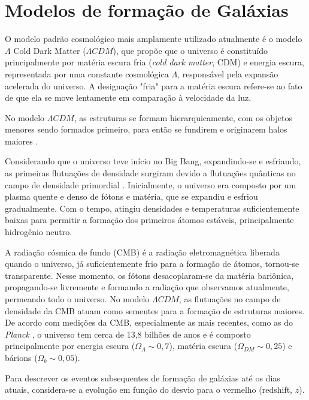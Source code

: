 \section{Modelos de formação de Galáxias}\label{subsec:modelo_formacao_galaxias}
O modelo padrão cosmológico mais amplamente utilizado atualmente é o modelo $\Lambda$ Cold Dark Matter ($\Lambda CDM$), que propõe que o universo é constituído principalmente por matéria escura fria ({\it cold dark matter}, CDM) e energia escura, representada por uma constante cosmológica $\Lambda$, responsável pela expansão acelerada do universo. A designação "fria" para a matéria escura refere-se ao fato de que ela se move lentamente em comparação à velocidade da luz. 

No modelo $\Lambda CDM$, as estruturas se formam hierarquicamente, com os objetos menores sendo formados primeiro, para então se fundirem e originarem halos maiores \citep{Blumenthal_1984}.

Considerando que o universo teve início no Big Bang, expandindo-se e esfriando, as primeiras flutuações de densidade surgiram devido a flutuações quânticas no campo de densidade primordial \citep{liddle_1999}. Inicialmente, o universo era composto por um plasma quente e denso de fótons e matéria, que se expandiu e esfriou gradualmente. Com o tempo, atingiu densidades e temperaturas suficientemente baixas para permitir a formação dos primeiros átomos estáveis, principalmente hidrogênio neutro.

A radiação cósmica de fundo (CMB) é a radiação eletromagnética liberada quando o universo, já suficientemente frio para a formação de átomos, tornou-se transparente. Nesse momento, os fótons desacoplaram-se da matéria bariônica, propagando-se livremente e formando a radiação que observamos atualmente, permeando todo o universo. No modelo $\Lambda CDM$, as flutuações no campo de densidade da CMB atuam como sementes para a formação de estruturas maiores. De acordo com medições da CMB, especialmente as mais recentes, como as do \textit{Planck} \citep{Planck_2020}, o universo tem cerca de 13,8 bilhões de anos e é composto principalmente por energia escura ($\Omega_\Lambda \sim 0,7$), matéria escura ($\Omega_{DM} \sim 0,25$) e bárions ($\Omega_b \sim 0,05$).

Para descrever os eventos subsequentes de formação de galáxias até os dias atuais, considera-se a evolução em função do desvio para o vermelho (redshift, $z$).

